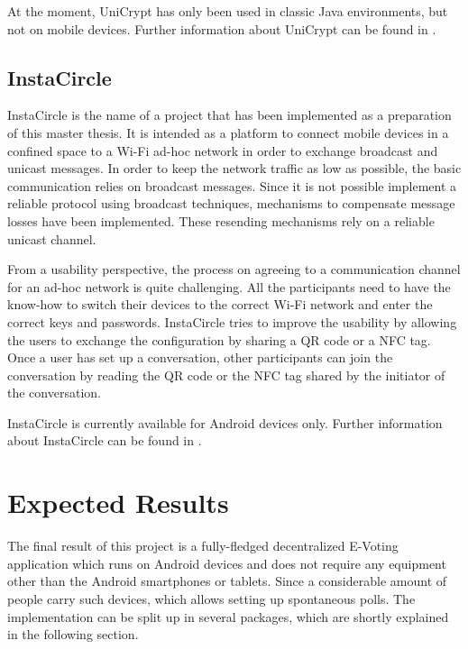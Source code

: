 \documentclass[numbers=noenddot, abstract=on, a4paper, headsepline,
footsepline, oneside, draft=off]{scrreprt}
\begin{document}
At the moment, UniCrypt has only been used in classic Java environments, but not
on mobile devices. Further information about UniCrypt can be found in
\cite{ritter12}.

\section{InstaCircle}
\label{sec:instacircle}
InstaCircle is the name of a project that has been implemented as a preparation
of this master thesis. It is intended as a platform to connect mobile devices
in a confined space to a Wi-Fi ad-hoc network in order to exchange broadcast
and unicast messages. In order to keep the network traffic as low as possible,
the basic communication relies on broadcast messages. Since it is not possible
implement a reliable protocol using broadcast techniques, mechanisms to
compensate message losses have been implemented. These resending mechanisms rely
on a reliable unicast channel.

From a usability perspective, the process on agreeing to a communication channel
for an ad-hoc network is quite challenging. All the participants need to have
the know-how to switch their devices to the correct Wi-Fi network and enter the
correct keys and passwords. InstaCircle tries to improve the usability by
allowing the users to exchange the configuration by sharing a QR code or a NFC
tag. Once a user has set up a conversation, other participants can join the
conversation by reading the QR code or the NFC tag shared by the initiator of
the conversation.

InstaCircle is currently available for Android devices only. Further information
about InstaCircle can be found in \cite{ritter13a}.

\chapter{Expected Results}
\label{cha:expectedresults}
The final result of this project is a fully-fledged decentralized E-Voting
application which runs on Android devices and does not require any equipment
other than the Android smartphones or tablets. Since a considerable amount of
people carry such devices, which allows setting up spontaneous polls. The
implementation can be split up in several packages, which are shortly explained
in the following section.
\end{document}
